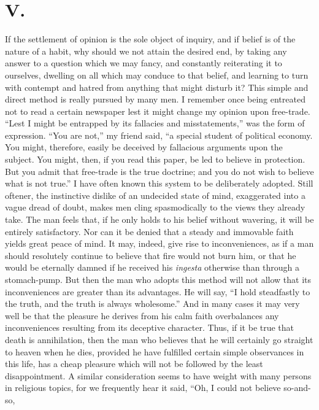 \section{V.}

If the settlement of opinion is the sole object of inquiry, and if
belief is of the nature of a habit, why should we not attain the
desired end, by taking any answer to a question which we may fancy,
and constantly reiterating it to ourselves, dwelling on all which may
conduce to that belief, and learning to turn with contempt and hatred
from anything that might disturb it? This simple and direct method is
really pursued by many men. I remember once being entreated not to
read a certain newspaper lest it might change my opinion upon
free-trade. ``Lest I might be entrapped by its fallacies and
misstatements,'' was the form of expression. ``You are not,'' my
friend said, ``a special student of political economy. You might,
therefore, easily be deceived by fallacious arguments upon the
subject. You might, then, if you read this paper, be led to believe in
protection. But you admit that free-trade is the true doctrine; and
you do not wish to believe what is not true.'' I have often known this
system to be deliberately adopted. Still oftener, the instinctive
dislike of an undecided state of mind, exaggerated into a vague dread
of doubt, makes men cling spasmodically to the views they already
take. The man feels that, if he only holds to his belief without
wavering, it will be entirely satisfactory. Nor can it be denied that
a steady and immovable faith yields great peace of mind. It may,
indeed, give rise to inconveniences, as if a man should resolutely
continue to believe that fire would not burn him, or that he would be
eternally damned if he received his \textit{ingesta} otherwise than
through a stomach-pump. But then the man who adopts this method will
not allow that its inconveniences are greater than its advantages. He
will say, ``I hold steadfastly to the truth, and the truth is always
wholesome.'' And in many cases it may very well be that the pleasure
he derives from his calm faith overbalances any inconveniences
resulting from its deceptive character. Thus, if it be true that death
is annihilation, then the man who believes that he will certainly go
straight to heaven when he dies, provided he have fulfilled certain
simple observances in this life, has a cheap pleasure which will not
be followed by the least disappointment. A similar consideration seems
to have weight with many persons in religious topics, for we
frequently hear it said, ``Oh,  I could not believe so-and-so,
